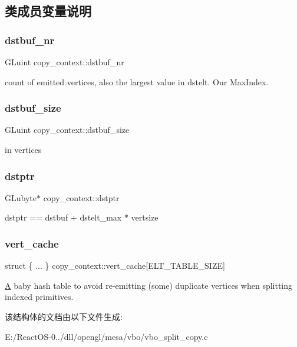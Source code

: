 \subsection{类成员变量说明}
\mbox{\label{structcopy__context_aaca1d9264be422e6efb212974a9091ae}} 
\subsubsection{\texorpdfstring{dstbuf\+\_\+nr}{dstbuf\_nr}}
{\footnotesize\ttfamily G\+Luint copy\+\_\+context\+::dstbuf\+\_\+nr}

count of emitted vertices, also the largest value in dstelt. Our Max\+Index. \mbox{\label{structcopy__context_a2e800ea59d50774cd970e518a044bf25}} 
\subsubsection{\texorpdfstring{dstbuf\+\_\+size}{dstbuf\_size}}
{\footnotesize\ttfamily G\+Luint copy\+\_\+context\+::dstbuf\+\_\+size}

in vertices \mbox{\label{structcopy__context_a089586b7ecf3cbc8aeb3e4bb422c562c}} 
\subsubsection{\texorpdfstring{dstptr}{dstptr}}
{\footnotesize\ttfamily G\+Lubyte$\ast$ copy\+\_\+context\+::dstptr}

dstptr == dstbuf + dstelt\+\_\+max $\ast$ vertsize \mbox{\label{structcopy__context_aa8d823854bf2e2a8197b20efa0ccb454}} 
\subsubsection{\texorpdfstring{vert\+\_\+cache}{vert\_cache}}
{\footnotesize\ttfamily struct \{ ... \}   copy\+\_\+context\+::vert\+\_\+cache\mbox{[}E\+L\+T\+\_\+\+T\+A\+B\+L\+E\+\_\+\+S\+I\+ZE\mbox{]}}

\hyperlink{struct_a}{A} baby hash table to avoid re-\/emitting (some) duplicate vertices when splitting indexed primitives. 

该结构体的文档由以下文件生成\+:\begin{DoxyCompactItemize}
\item 
E\+:/\+React\+O\+S-\/0../dll/opengl/mesa/vbo/vbo\+\_\+split\+\_\+copy.\+c\end{DoxyCompactItemize}
